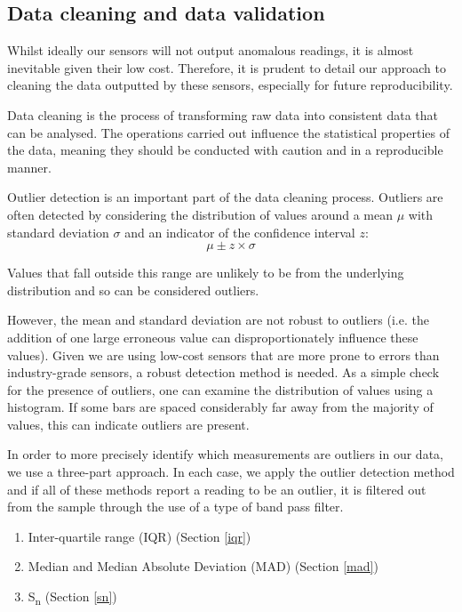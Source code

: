 \documentclass[11pt]{report}
\begin{document}
\subsection{Data cleaning and data validation}

Whilst ideally our sensors will not output anomalous readings, it is almost inevitable given their low cost. Therefore, it is prudent to detail our approach to cleaning the data outputted by these sensors, especially for future reproducibility.

Data cleaning is the process of transforming raw data into consistent data that can be analysed. The operations carried out influence the statistical properties of the data, meaning they should be conducted with caution and in a reproducible manner.

Outlier detection is an important part of the data cleaning process. Outliers are often detected by considering the distribution of values around a mean $\mu$ with standard deviation $\sigma$ and an indicator of the confidence interval $z$:
\begin{equation}
\mu \pm z \times \sigma
\end{equation}

Values that fall outside this range are unlikely to be from the underlying distribution and so can be considered outliers.

However, the mean and standard deviation are not robust to outliers (i.e. the addition of one large erroneous value can disproportionately influence these values). Given we are using low-cost sensors that are more prone to errors than industry-grade sensors, a robust detection method is needed. As a simple check for the presence of outliers, one can examine the distribution of values using a histogram. If some bars are spaced considerably far away from the majority of values, this can indicate outliers are present.

In order to more precisely identify which measurements are outliers in our data, we use a three-part approach. In each case, we apply the outlier detection method and if all of these methods report a reading to be an outlier, it is filtered out from the sample through the use of a type of band pass filter.
\begin{enumerate}
\item Inter-quartile range (IQR) (Section \ref{iqr})
\item Median and Median Absolute Deviation (MAD) (Section \ref{mad})
\item S\textsubscript{n} (Section \ref{sn})
\end{enumerate}
\end{document}
